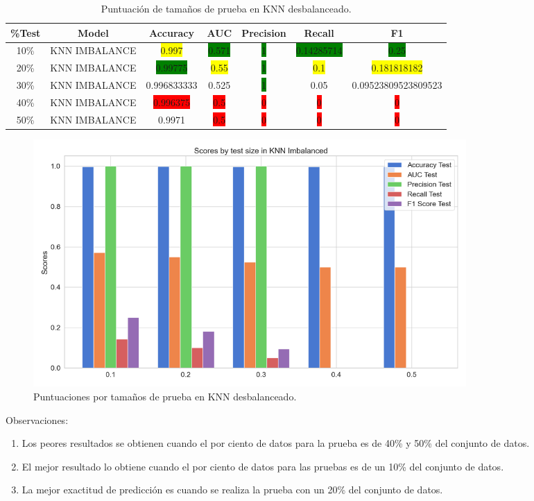 \begin{table}[h!]
	\begin{longtable}{|c|c|c|c|c|c|c|}
		\hline
		\%Test & Model & Accuracy & AUC & Precision& Recall & F1 \\ \hline
		10\% & KNN IMBALANCE & \colorbox{yellow}{0.997} & \colorbox{green}{0.571} & \colorbox{green}{1} & \colorbox{green}{0.14285714} & \colorbox{green}{0.25} \\ \hline
		20\% & KNN IMBALANCE & \colorbox{green}{0.99775} & \colorbox{yellow}{0.55} & \colorbox{green}{1} & \colorbox{yellow}{0.1} & \colorbox{yellow}{0.181818182}\\ \hline
		30\% & KNN IMBALANCE & 0.996833333 & 0.525 & \colorbox{green}{1} & 0.05 & 0.09523809523809523\\ \hline
		40\% & KNN IMBALANCE & \colorbox{red}{0.996375} & \colorbox{red}{0.5} & \colorbox{red}{0} & \colorbox{red}{0} & \colorbox{red}{0}\\ \hline
		50\% & KNN IMBALANCE & 0.9971 & \colorbox{red}{0.5}	& \colorbox{red}{0} & \colorbox{red}{0} & \colorbox{red}{0}\\ \hline
	\end{longtable}
	\caption{Puntuaci\'{o}n de tama\~{n}os de prueba en KNN desbalanceado.}
	\label{t:1}
\end{table}

\begin{figure}[h!]
	\centering
	\includegraphics[width=0.8\textwidth]{"figuras/Experimento1/KNN_Test_size"}
	\caption{Puntuaciones por tama\~{n}os de prueba en KNN desbalanceado.}
\end{figure}

Observaciones:
\begin{enumerate}
	\item Los peores resultados se obtienen cuando el por ciento de datos para la prueba es de 40\% y 50\% del conjunto de datos.
	\item El mejor resultado lo obtiene cuando el por ciento de datos para las pruebas es de un 10\% del conjunto de datos.
	\item La mejor exactitud de predicci\'{o}n es cuando se realiza la prueba con un 20\% del conjunto de datos.
\end{enumerate}

